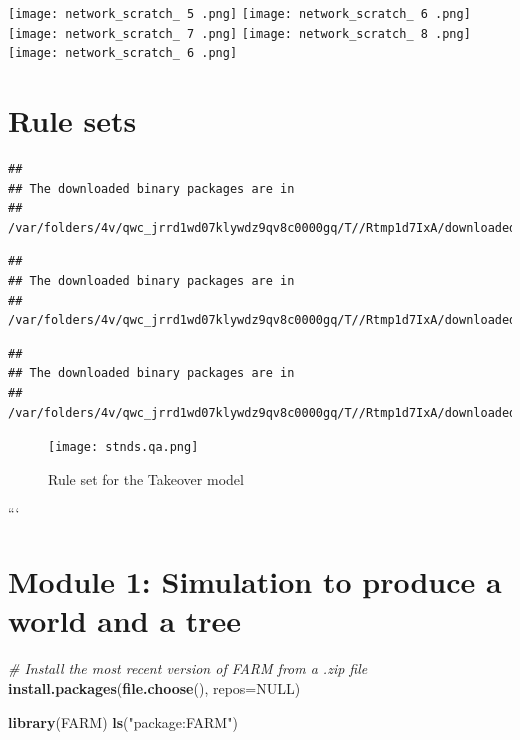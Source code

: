 \documentclass[]{book}
\newenvironment{Shaded}{\begin{snugshade}}{\end{snugshade}}
\newcommand{\KeywordTok}[1]{\textcolor[rgb]{0.13,0.29,0.53}{\textbf{{#1}}}}
\newcommand{\DataTypeTok}[1]{\textcolor[rgb]{0.13,0.29,0.53}{{#1}}}
\newcommand{\StringTok}[1]{\textcolor[rgb]{0.31,0.60,0.02}{{#1}}}
\newcommand{\CommentTok}[1]{\textcolor[rgb]{0.56,0.35,0.01}{\textit{{#1}}}}
\newcommand{\OtherTok}[1]{\textcolor[rgb]{0.56,0.35,0.01}{{#1}}}
\newcommand{\NormalTok}[1]{{#1}}
\theoremstyle{definition}
\theoremstyle{definition}
\theoremstyle{remark}
\begin{document}
\texttt{[image: network\_scratch\_ 5 .png]}
\texttt{[image: network\_scratch\_ 6 .png]}
\texttt{[image: network\_scratch\_ 7 .png]}
\texttt{[image: network\_scratch\_ 8 .png]}
\texttt{[image: network\_scratch\_ 6 .png]}

\chapter{Rule sets}\label{rule-sets}

\begin{verbatim}
## 
## The downloaded binary packages are in
##  /var/folders/4v/qwc_jrrd1wd07klywdz9qv8c0000gq/T//Rtmp1d7IxA/downloaded_packages
\end{verbatim}

\begin{verbatim}
## 
## The downloaded binary packages are in
##  /var/folders/4v/qwc_jrrd1wd07klywdz9qv8c0000gq/T//Rtmp1d7IxA/downloaded_packages
\end{verbatim}

\begin{verbatim}
## 
## The downloaded binary packages are in
##  /var/folders/4v/qwc_jrrd1wd07klywdz9qv8c0000gq/T//Rtmp1d7IxA/downloaded_packages
\end{verbatim}

\begin{figure}
\centering
\texttt{[image: stnds.qa.png]}
\caption{Rule set for the Takeover model}
\end{figure}

```

\chapter{Module 1: Simulation to produce a world and a
tree}\label{module-1-simulation-to-produce-a-world-and-a-tree}

\begin{Shaded}
\begin{Highlighting}[]
\CommentTok{# Install the most recent version of FARM from a .zip file}
\KeywordTok{install.packages}\NormalTok{(}\KeywordTok{file.choose}\NormalTok{(), }\DataTypeTok{repos=}\OtherTok{NULL}\NormalTok{) }
\end{Highlighting}
\end{Shaded}

\begin{Shaded}
\begin{Highlighting}[]
\KeywordTok{library}\NormalTok{(FARM)}
\KeywordTok{ls}\NormalTok{(}\StringTok{"package:FARM"}\NormalTok{)}
\end{Highlighting}
\end{Shaded}
\end{document}
